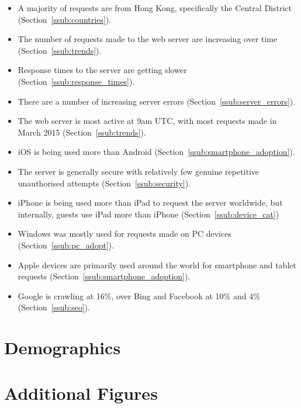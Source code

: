 \documentclass[12pt,titlepage]{article}
\begin{document}
\begin{itemize}
  \item A majority of requests are from Hong Kong, specifically the Central District (Section~\ref{ssub:countries}).
  \item The number of requests made to the web server are increasing over time (Section~\ref{ssub:trends}).
  \item Response times to the server are getting slower (Section~\ref{ssub:response_times}).
  \item There are a number of increasing server errors (Section~\ref{ssub:server_errors}).
  \item The web server is most active at 9am UTC, with most requests made in March 2015 (Section~\ref{ssub:trends}).
  \item iOS is being used more than Android (Section~\ref{ssub:smartphone_adoption}).
  \item The server is generally secure with relatively few genuine repetitive unauthorised attempts (Section~\ref{ssub:security}).
  \item iPhone is being used more than iPad to request the server worldwide, but internally, guests use iPad more than iPhone (Section~\ref{ssub:device_cat})
  \item Windows was mostly used for requests made on PC devices (Section~\ref{ssub:pc_adopt}).
  \item Apple devices are primarily used around the world for smartphone and tablet requests (Section~\ref{ssub:smartphone_adoption}).
  \item Google is crawling at 16\%, over Bing and Facebook at 10\% and 4\% (Section~\ref{ssub:seo}).
\end{itemize}

\newpage
\section{Demographics}


\newpage
\appendix

\section{Additional Figures}

\clearpage
\end{document}
